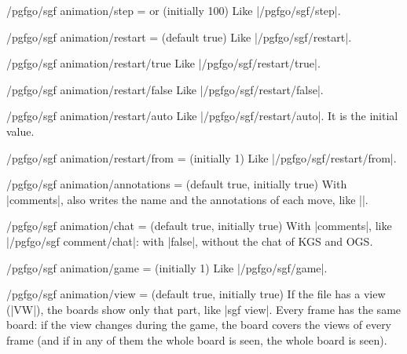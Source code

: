\begin{key}{/pgfgo/sgf animation/step =  or  (initially 100)}
	Like |/pgfgo/sgf/step|.
\end{key}

\begin{key}{/pgfgo/sgf animation/restart =  (default true)}
	Like |/pgfgo/sgf/restart|.
\end{key}

\begin{key}{/pgfgo/sgf animation/restart/true}
	Like |/pgfgo/sgf/restart/true|.
\end{key}

\begin{key}{/pgfgo/sgf animation/restart/false}
	Like |/pgfgo/sgf/restart/false|.
\end{key}

\begin{key}{/pgfgo/sgf animation/restart/auto}
	Like |/pgfgo/sgf/restart/auto|. It is the initial value.
\end{key}

\begin{key}{/pgfgo/sgf animation/restart/from =  (initially 1)}
	Like |/pgfgo/sgf/restart/from|.
\end{key}

\begin{key}{/pgfgo/sgf animation/annotations =  (default true, initially true)}
	With |comments|, also writes the name and the annotations of each move, like |\sgfcomment|.
\end{key}

\begin{key}{/pgfgo/sgf animation/chat =  (default true, initially true)}
	With |comments|, like |/pgfgo/sgf comment/chat|: with |false|, without the chat of KGS and OGS.
\end{key}

\begin{key}{/pgfgo/sgf animation/game =  (initially 1)}
	Like |/pgfgo/sgf/game|.
\end{key}

\begin{key}{/pgfgo/sgf animation/view =  (default true, initially true)}
	If the file has a view (|VW|), the boards show only that part, like |sgf view|. Every frame has the same board: if the view changes during the game, the board covers the views of every frame (and if in any of them the whole board is seen, the whole board is seen).
\end{key}

